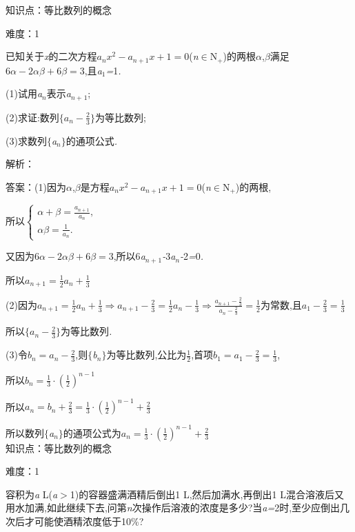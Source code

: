 \documentclass{article} %
\begin{document}
知识点：等比数列的概念

难度：1

 已知关于\textit{x}的二次方程$a_nx^2-a_{n+1}x+1=0$(\textit{n}$\mathrm{\in}$N\textit{${}_{+}$})的两根\textit{$\alpha$},\textit{$\beta$}满足$6\alpha-2\alpha \beta+6\beta=3$,且\textit{a}${}_{1}$\textit{=}1\textit{.}

 (1)试用\textit{a${}_{n}$}表示\textit{a${}_{n+}$}${}_{1}$;

 (2)求证:数列$\{a_n-\frac{2}{3}\}$为等比数列;

 (3)求数列$\mathrm{\{}$\textit{a${}_{n}$}$\mathrm{\}}$的通项公式\textit{.}

解析：

 答案：(1)因为\textit{$\alpha$},\textit{$\beta$}是方程$a_nx^2-a_{n+1}x+1=0$(\textit{n}$\mathrm{\in}$N\textit{${}_{+}$})的两根,

所以$\left\{
\begin{array}{l}
\alpha +\beta=\frac{a_{n+1}}{a_n}, \\
\alpha \beta =\frac{1}{a_n}.
\end{array}
\right.$

又因为$6\alpha-2\alpha \beta +6\beta=3$,所以6\textit{a${}_{n+}$}${}_{1}$\textit{-}3\textit{a${}_{n}$-}2\textit{=}0\textit{.}

所以$a_{n+1}=\frac{1}{2}a_n+\frac{1}{3}$

 (2)因为$a_{n+1}=\frac{1}{2}a_n+\frac{1}{3} \Rightarrow a_{n+1}-\frac{2}{3}=\frac{1}{2}a_n-\frac{1}{3}\Rightarrow \frac{a_{n+1}-\frac{2}{3}}{a_n-\frac{2}{3}}=\frac{1}{2}$为常数,且$a_1-\frac{2}{3}=\frac{1}{3}$

所以$\{a_n-\frac{2}{3}\}$为等比数列\textit{.}

 (3)令$b_n=a_n-\frac{2}{3}$,则$\mathrm{\{}$\textit{b${}_{n}$}$\mathrm{\}}$为等比数列,公比为$\frac{1}{2}$,首项$b_1=a_1-\frac{2}{3}=\frac{1}{3}$,

所以$b_n=\frac{1}{3}\cdot (\frac{1}{2})^{n-1}$

所以$a_n=b_n+\frac{2}{3}=\frac{1}{3}\cdot (\frac{1}{2})^{n-1}+\frac{2}{3}$

所以数列$\mathrm{\{}$\textit{a${}_{n}$}$\mathrm{\}}$的通项公式为$a_n=\frac{1}{3}\cdot (\frac{1}{2})^{n-1}+\frac{2}{3}$ \\

知识点：等比数列的概念

难度：1

 容积为\textit{a} L(\textit{a$>$}1)的容器盛满酒精后倒出1 L,然后加满水,再倒出1 L混合溶液后又用水加满,如此继续下去,问第\textit{n}次操作后溶液的浓度是多少?当\textit{a=}2时,至少应倒出几次后才可能使酒精浓度低于10\%?
\end{document}
